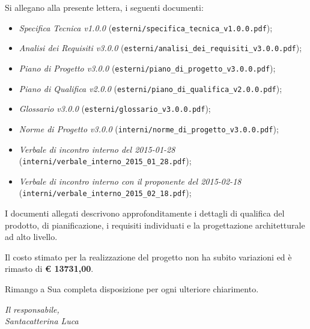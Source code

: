 \documentclass[10pt,a4paper,sans]{moderncv}        %
\begin{document}
Si allegano alla presente lettera, i seguenti documenti:
	\begin{itemize}
		\item \textit{Specifica Tecnica v1.0.0} ({\verb!esterni/specifica_tecnica_v1.0.0.pdf!});
		\item \textit{Analisi dei Requisiti v3.0.0} ({\verb!esterni/analisi_dei_requisiti_v3.0.0.pdf!});
		\item \textit{Piano di Progetto v3.0.0} ({\verb!esterni/piano_di_progetto_v3.0.0.pdf!});
		\item \textit{Piano di Qualifica v2.0.0} ({\verb!esterni/piano_di_qualifica_v2.0.0.pdf!});
		\item \textit{Glossario v3.0.0} ({\verb!esterni/glossario_v3.0.0.pdf!});
		\item \textit{Norme di Progetto v3.0.0} ({\verb!interni/norme_di_progetto_v3.0.0.pdf!});
		\item \textit{Verbale di incontro interno del 2015-01-28} ({\verb!interni/verbale_interno_2015_01_28.pdf!});
		\item \textit{Verbale di incontro interno con il proponente del 2015-02-18} ({\verb!interni/verbale_interno_2015_02_18.pdf!});
	\end{itemize}
\noindent
I documenti allegati descrivono approfonditamente i dettagli di qualifica del prodotto, di pianificazione, i requisiti individuati e la progettazione architetturale ad alto livello.

Il costo stimato per la realizzazione del progetto non ha subito variazioni ed è rimasto di \textbf{\euro{} 13731,00}.

Rimango a Sua completa disposizione per ogni ulteriore chiarimento.
	\begin{flushright}
		\textit{Il responsabile,}\\ 
		\textit{Santacatterina Luca}
	\end{flushright}
\end{document}
